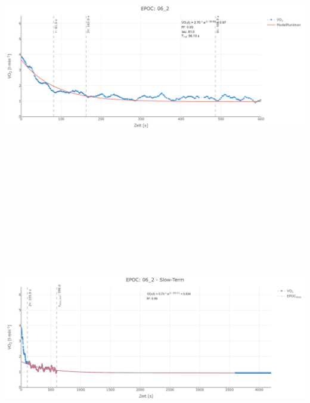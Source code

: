 \documentclass[
  letterpaper,
  DIV=11]{scrartcl}
\begin{document}
\includegraphics[width=11.45833in,height=4.6875in]{images/06_2_tau.png}
\includegraphics[width=11.45833in,height=4.6875in]{images/06_2_slow.png}
\end{document}
